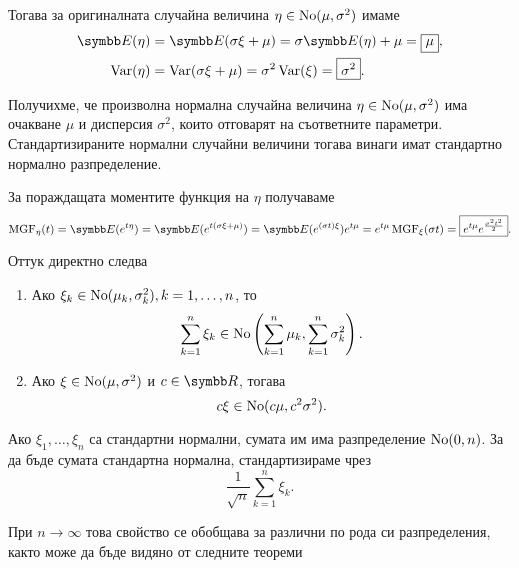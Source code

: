 \documentclass[numbers=endperiod, bibliography=totocnumbered]{scrartcl}
\begin{document}
Тогава за оригиналната случайна величина \( \eta \in \operatorname{No}(\mu, \sigma^2) \) имаме
\begin{align*}
  \Expect(\eta) &= \Expect(\sigma \xi + \mu) = \sigma \Expect(\eta) + \mu = \boxed{\mu}, \\
  \Var(\eta) &= \Var(\sigma \xi + \mu) = \sigma^2 \Var(\xi) = \boxed{\sigma^2}.
\end{align*}

Получихме, че произволна нормална случайна величина \( \eta \in \operatorname{No}(\mu, \sigma^2) \) има очакване \( \mu \) и дисперсия \( \sigma^2 \), които отговарят на съответните параметри. Стандартизираните нормални случайни величини тогава винаги имат стандартно нормално разпределение.

За пораждащата моментите функция на \( \eta \) получаваме
\begin{equation*}
  \MGF_\eta(t)
  =
  \Expect(e^{t\eta})
  =
  \Expect(e^{t(\sigma\xi + \mu)})
  =
  \Expect(e^{(\sigma t) \xi}) e^{t\mu}
  =
  e^{t\mu} \MGF_\xi(\sigma t)
  =
  \boxed{e^{t\mu} e^{\frac {\sigma^2 t^2} 2}}.
\end{equation*}

Оттук директно следва
\begin{proposition}\label{thm:normal_distribution_is_stable}
  \mbox{}
  \begin{enumerate}
    \item Ако \( \xi_k \in \operatorname{No}(\mu_k, \sigma_k^2), k = 1, \ldots, n \), то
    \begin{equation*}
      \sum_{k=1}^n \xi_k \in \operatorname{No}\left( \sum_{k=1}^n \mu_k, \sum_{k=1}^n \sigma_k^2 \right).
    \end{equation*}

    \item Ако \( \xi \in \operatorname{No}(\mu, \sigma^2) \) и \( c \in \R \), тогава
    \begin{equation*}
      c \xi \in \operatorname{No}(c \mu, c^2 \sigma^2).
    \end{equation*}
  \end{enumerate}
\end{proposition}

Ако \( \xi_1, \ldots, \xi_n \) са стандартни нормални, сумата им има разпределение \( \operatorname{No}(0, n) \). За да бъде сумата стандартна нормална, стандартизираме чрез
\begin{equation*}
  \frac 1 {\sqrt n} \sum_{k=1}^n \xi_k.
\end{equation*}

При \( n \to \infty \) това свойство се обобщава за различни по рода си разпределения, както може да бъде видяно от следните теореми
\end{document}
